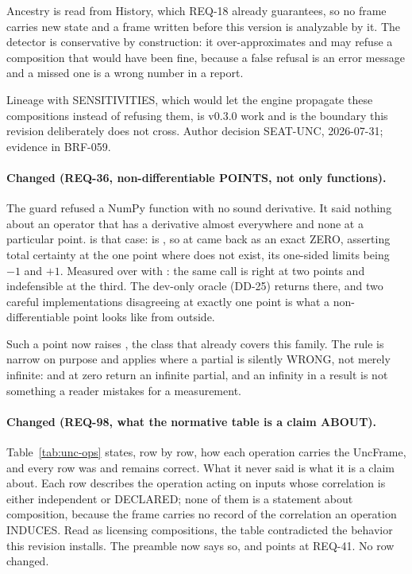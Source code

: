 Ancestry is read from History, which REQ-18 already guarantees, so no
frame carries new state and a frame written before this version is
analyzable by it. The detector is conservative by construction: it
over-approximates and may refuse a composition that would have been
fine, because a false refusal is an error message and a missed one is a
wrong number in a report.

Lineage with SENSITIVITIES, which would let the engine propagate these
compositions instead of refusing them, is v0.3.0 work and is the
boundary this revision deliberately does not cross. Author decision
SEAT-UNC, 2026-07-31; evidence in BRF-059.

\paragraph{Changed (REQ-36, non-differentiable POINTS, not only
functions).} The guard refused a NumPy function with no sound
derivative. It said nothing about an operator that has a derivative
almost everywhere and none at a particular point.  is that
case:  is , so  at 
came back as an exact ZERO, asserting total certainty at the one point
where  does not exist, its one-sided limits being $-1$ and
$+1$. Measured  over 
with : the same call is right at two points and
indefensible at the third. The dev-only oracle (DD-25) returns
 there, and two careful implementations disagreeing at exactly
one point is what a non-differentiable point looks like from outside.

Such a point now raises , the class
that already covers this family. The rule is narrow on purpose and
applies where a partial is silently WRONG, not merely infinite:
 and  at zero return an infinite partial, and an
infinity in a result is not something a reader mistakes for a
measurement.

\paragraph{Changed (REQ-98, what the normative table is a claim ABOUT).}
Table~\ref{tab:unc-ops} states, row by row, how each operation carries
the UncFrame, and every row was and remains correct. What it never said
is what it is a claim about. Each row describes the operation acting on
inputs whose correlation is either independent or DECLARED; none of them
is a statement about composition, because the frame carries no record of
the correlation an operation INDUCES. Read as licensing compositions,
the table contradicted the behavior this revision installs. The preamble
now says so, and points at REQ-41. No row changed.

